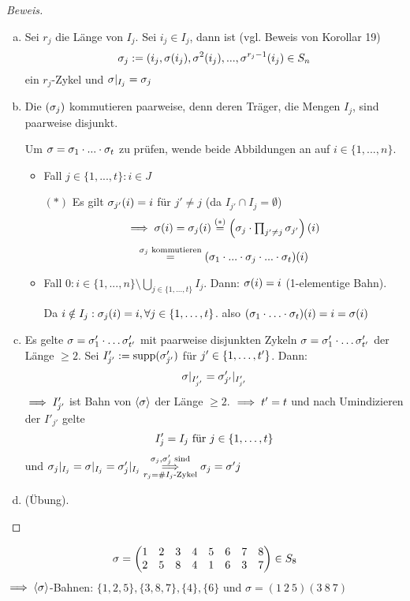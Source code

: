 \documentclass[a4paper]{report}
\begin{document}
\begin{proof}[Beweis]
\begin{enumerate}[(a)]
  \item Sei $r_{j}$ die Länge von $I_{j}$. Sei $i_{j} \in I_{j}$, dann ist (vgl. Beweis von Korollar 19)
        \[\sigma_{j}:= (i_{j}, \sigma(i_{j}), \sigma^{2}(i_{j}), ..., \sigma^{r_{j}-1}(i_{j}) \in S_n\]
        ein $r_{j}$-Zykel und $\sigma|_{I_{j}} = \sigma_{j}$
  \item Die $(\sigma_{j})$ kommutieren paarweise, denn deren Träger, die Mengen $I_j$, sind paarweise disjunkt.

        Um $\sigma = \sigma_{1} \cdot ... \cdot \sigma_{t}$ zu prüfen, wende beide Abbildungen an auf $i \in \{1, ..., n\}$.
        \begin{itemize}
          \item Fall $j \in \{1, ..., t\}: i \in J$

               $(*)$ Es gilt $\sigma_{j'}(i) = i$ für $j' \ne j$ (da $I_{j'} \cap I_{j} = \emptyset$)
                \[\implies \sigma(i) = \sigma_{j}(i) \overset{(*)} = \left(\sigma_{j} \cdot \textstyle \prod_{j' \ne j}\sigma_{j'}\right)(i)\]
                \[\overset{\sigma_{j} \text{ kommutieren}} = (\sigma_{1} \cdot ... \cdot \sigma_{j} \cdot ... \cdot \sigma_{t})(i)\]
          \item Fall $0: i \in \{1, ..., n\} \setminus \bigcup_{j \in \{1, ..., t\}} I_{j}$. Dann:
                \(\sigma(i) = i\) (1-elementige Bahn).

                Da $i \notin I_{j}: \sigma_{j}(i) = i, \forall j \in \{1, \ldots, t\}$. also $(\sigma_{1} \cdot \ldots \cdot \sigma_{t})(i) = i = \sigma(i)$
        \end{itemize}
  \item Es gelte $\sigma = \sigma_{1}' \cdot \ldots \sigma_{t'}'$ mit paarweise disjunkten Zykeln $\sigma = \sigma_{1}' \cdot \ldots \sigma_{t'}'$  der Länge $\ge 2$.
        Sei $I'_{j'} := \operatorname{supp}(\sigma'_{j'})$ für $j' \in \{1, \ldots, t'\}$. Dann:
        \[\sigma|_{I'_{j'}} = \sigma'_{j'}|_{I'_{j'}}\]
        \(\implies {I'_{j'}}\) ist Bahn von $\langle\sigma\rangle$ der Länge $\ge 2$. $\implies t' = t$ und nach Umindizieren der $I'_{j'}$ gelte \[I'_{j} = I_{j} \text{ für } j \in \{1, \ldots, t\}\]
        und $\s_{j}|_{I_{j}} = \s|_{I_{j}} = \s'_{j}|_{I_{j}} \overunderset{\s_{j}, \s'_{j} \text{ sind}}{r_{j} = \#I_{j} \text{-Zykel}}\imp \s_{j} = \s'j$
  \item (Übung). \qedhere
\end{enumerate}
\end{proof}
\begin{bsp}
\[\sigma = \begin{pmatrix}
        1 & 2 & 3 & 4 & 5 & 6 & 7 & 8 \\
        2 & 5 & 8 & 4 & 1 & 6 & 3 & 7
      \end{pmatrix} \in S_{8}\]
    \(\implies \langle\sigma\rangle\)-Bahnen: $\{1, 2, 5\}, \{3, 8, 7\}, \{4\}, \{6\}$ und $\sigma= (1\ 2\ 5)(3\ 8\ 7)$
\end{bsp}
\end{document}
